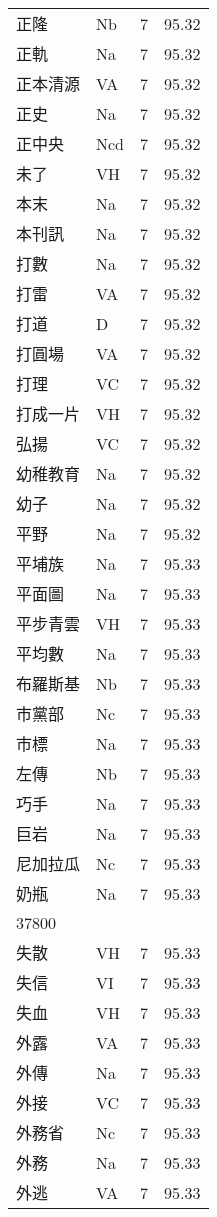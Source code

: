 \documentclass[twocolumn]{book}
\begin{document}
\begin{supertabular}{llrr}
正隆 & Nb & 7 &  95.32\\
正軌 & Na & 7 &  95.32\\
正本清源 & VA & 7 &  95.32\\
正史 & Na & 7 &  95.32\\
正中央 & Ncd & 7 &  95.32\\
未了 & VH & 7 &  95.32\\
本末 & Na & 7 &  95.32\\
本刊訊 & Na & 7 &  95.32\\
打數 & Na & 7 &  95.32\\
打雷 & VA & 7 &  95.32\\
打道 & D & 7 &  95.32\\
打圓場 & VA & 7 &  95.32\\
打理 & VC & 7 &  95.32\\
打成一片 & VH & 7 &  95.32\\
弘揚 & VC & 7 &  95.32\\
幼稚教育 & Na & 7 &  95.32\\
幼子 & Na & 7 &  95.32\\
平野 & Na & 7 &  95.32\\
平埔族 & Na & 7 &  95.33\\
平面圖 & Na & 7 &  95.33\\
平步青雲 & VH & 7 &  95.33\\
平均數 & Na & 7 &  95.33\\
布羅斯基 & Nb & 7 &  95.33\\
市黨部 & Nc & 7 &  95.33\\
市標 & Na & 7 &  95.33\\
左傳 & Nb & 7 &  95.33\\
巧手 & Na & 7 &  95.33\\
巨岩 & Na & 7 &  95.33\\
尼加拉瓜 & Nc & 7 &  95.33\\
奶瓶 & Na & 7 &  95.33\\
37800\\
失散 & VH & 7 &  95.33\\
失信 & VI & 7 &  95.33\\
失血 & VH & 7 &  95.33\\
外露 & VA & 7 &  95.33\\
外傳 & Na & 7 &  95.33\\
外接 & VC & 7 &  95.33\\
外務省 & Nc & 7 &  95.33\\
外務 & Na & 7 &  95.33\\
外逃 & VA & 7 &  95.33\\

\end{supertabular}
\end{document}
